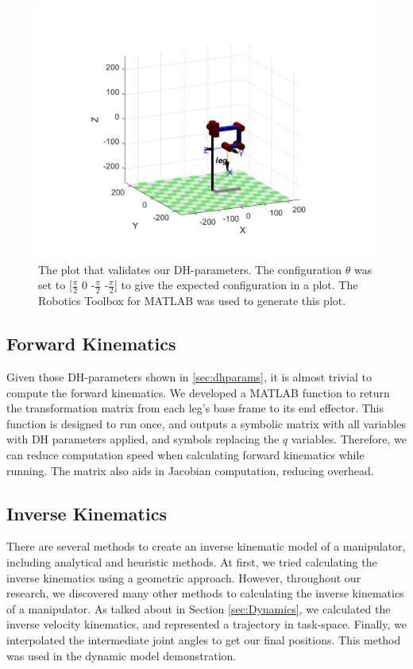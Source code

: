 \begin{figure}[thpb]
    \parbox{\linewidth}{\includegraphics[width=\linewidth]{Figures/dhvalidation.png}}
    \caption{The plot that validates our DH-parameters. The configuration $\theta$ was set to [$\frac{\pi}{2}$ 0 -$\frac{\pi}{2}$ -$\frac{\pi}{2}$] to give the expected configuration in a plot. The Robotics Toolbox for MATLAB was used to generate this plot.}
    \label{fig:dhvalidation}
\end{figure}

\subsection{Forward Kinematics}
Given those DH-parameters shown in \ref{sec:dhparams}, it is almost trivial to compute the forward kinematics. We developed a MATLAB function to return the transformation matrix from each leg's base frame to its end effector. This function is designed to run once, and outputs a symbolic matrix with all variables with DH parameters applied, and symbols replacing the $q$ variables. Therefore, we can reduce computation speed when calculating forward kinematics while running. The matrix also aids in Jacobian computation, reducing overhead.

\subsection{Inverse Kinematics}
There are several methods to create an inverse kinematic model of a manipulator, including analytical and heuristic methods. At first, we tried calculating the inverse kinematics using a geometric approach. However, throughout our research, we discovered many other methods to calculating the inverse kinematics of a manipulator. As talked about in Section \ref{sec:Dynamics}, we calculated the inverse velocity kinematics, and represented a trajectory in task-space. Finally, we interpolated the intermediate joint angles to get our final positions. This method was used in the dynamic model demonstration.

